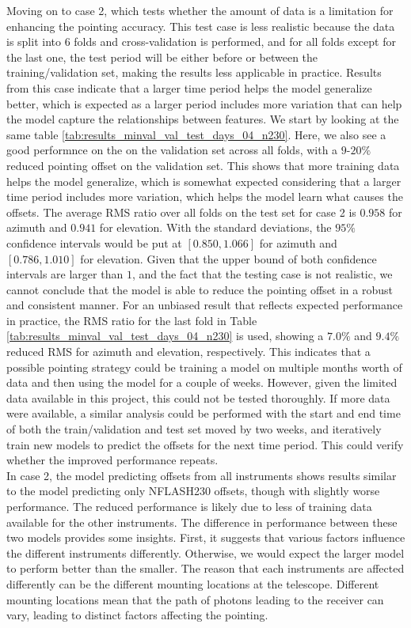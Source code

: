 Moving on to case 2, which tests whether the amount of data is a limitation for enhancing the pointing accuracy.
This test case is less realistic because the data is split into $6$ folds and cross-validation is performed,
and for all folds except for the last one, the test period will be either before or between the training/validation set, making the results less applicable in practice.
Results from this case indicate that a larger time period helps the model generalize better, which is expected as a larger period includes more variation that can help the model capture the relationships between features.
We start by looking at the same table \ref{tab:results_minval_val_test_days_04_n230}.
Here, we also see a good performnce on the on the validation set across all folds, with a $9$-$20\%$ reduced pointing offset on the validation set.
This shows that more training data helps the model generalize, which is somewhat expected considering that a larger time period includes more variation,
which helps the model learn what causes the offsets.
The average RMS ratio over all folds on the test set for case 2 is $0.958$ for azimuth and $0.941$ for elevation.
With the standard deviations, the $95\%$ confidence intervals would be put at $[0.850, 1.066]$ for azimuth and $[0.786, 1.010]$ for elevation.
Given that the upper bound of both confidence intervals are larger than $1$, and the fact that the testing case is not realistic,
we cannot conclude that the model is able to reduce the pointing offset in a robust and consistent manner.
For an unbiased result that reflects expected performance in practice, the RMS ratio for the last fold in Table \ref{tab:results_minval_val_test_days_04_n230} is used,
showing a $7.0\%$ and $9.4\%$ reduced RMS for azimuth and elevation, respectively.
This indicates that a possible pointing strategy could be training a model on multiple months worth of data and then using the model for a couple of weeks.
However, given the limited data available in this project, this could not be tested thoroughly.
If more data were available, a similar analysis could be performed with the start and end time of both the train/validation and test set moved by two weeks,
and iteratively train new models to predict the offsets for the next time period.
This could verify whether the improved performance repeats.\\

In case 2, the model predicting offsets from all instruments shows results similar to the model predicting only NFLASH230 offsets, though with slightly worse performance.
The reduced performance is likely due to less of training data available for the other instruments.
The difference in performance between these two models provides some insights.
First, it suggests that various factors influence the different instruments differently.
Otherwise, we would expect the larger model to perform better than the smaller.
The reason that each instruments are affected differently can be the different mounting locations at the telescope.
Different mounting locations mean that the path of photons leading to the receiver can vary, leading to distinct factors affecting the pointing.\\


